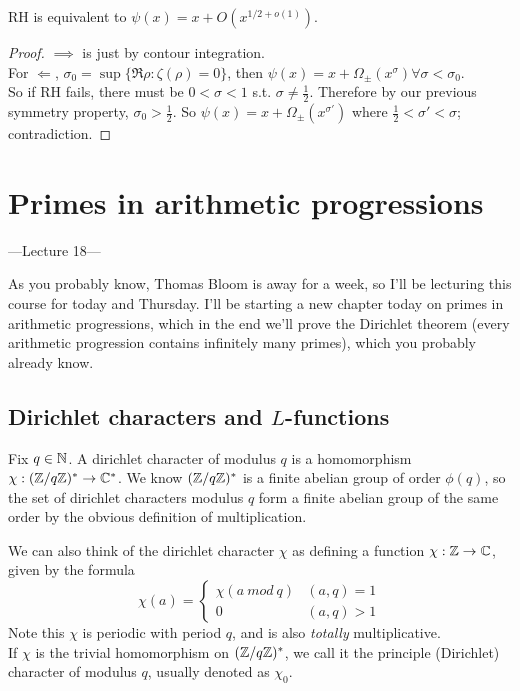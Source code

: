 \documentclass[a4paper]{article}
\begin{document}
\begin{thm}
RH is equivalent to $\psi(x) = x+O(x^{1/2+o(1)})$.
\begin{proof}
$\implies$ is just by contour integration.\\
For $\Leftarrow$, $\sigma_0=\sup\{\Re \rho: \zeta(\rho) = 0\}$, then $\psi(x) = x+\Omega_\pm(x^\sigma) \forall \sigma<\sigma_0$.\\
So if RH fails, there must be $0<\sigma<1$ s.t. $\sigma \neq \frac{1}{2}$. Therefore by our previous symmetry property, $\sigma_0 > \frac{1}{2}$. So $\psi(x) = x+\Omega_\pm(x^{\sigma'})$ where $\frac{1}{2} < \sigma' < \sigma$; contradiction.
\end{proof}
\end{thm}

\newpage

\section{Primes in arithmetic progressions}

---Lecture 18---

As you probably know, Thomas Bloom is away for a week, so I'll be lecturing this course for today and Thursday. I'll be starting a new chapter today on primes in arithmetic progressions, which in the end we'll prove the Dirichlet theorem (every arithmetic progression contains infinitely many primes), which you probably already know.

\subsection{Dirichlet characters and $L$-functions}

Fix $q \in \mathbb{N}$. A dirichlet character of modulus $q$ is a homomorphism $\chi: (\mathbb{Z}/q\mathbb{Z})^* \to \mathbb{C}^*$. We know $(\mathbb{Z}/q\mathbb{Z})^*$ is a finite abelian group of order $\phi(q)$, so the set of dirichlet characters modulus $q$ form a finite abelian group of the same order by the obvious definition of multiplication.

We can also think of the dirichlet character $\chi$ as defining a function $\chi:\mathbb{Z} \to \mathbb{C}$, given by the formula
\[
\chi(a) = \left\{
\begin{array}{ll}
\chi(a\ mod\ q) & (a,q)=1\\
0 & (a,q)>1
\end{array}
\right.
\]
Note this $\chi$ is periodic with period $q$, and is also \emph{totally} multiplicative.\\
If $\chi$ is the trivial homomorphism on $(\mathbb{Z}/q\mathbb{Z})^*$, we call it the principle (Dirichlet) character of modulus $q$, usually denoted as $\chi_0$.
\end{document}

